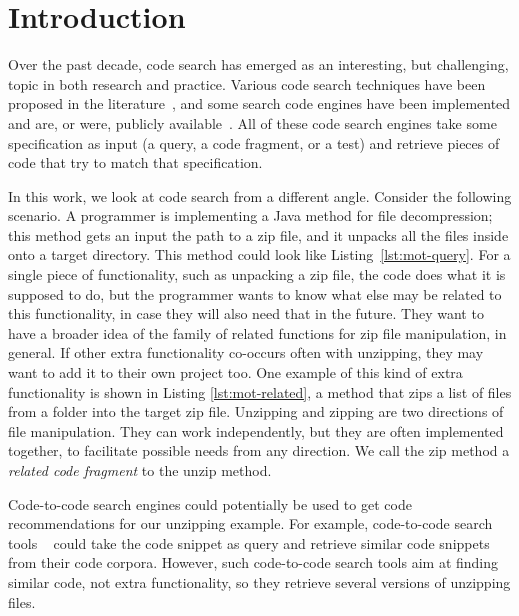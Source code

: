 \section{Introduction}
\label{sec:intro}

Over the past decade, code search has emerged as an interesting, but
challenging, topic in both research and practice. Various code search
techniques have been proposed in the
literature~\cite{bajracharya2009sourcerer,reiss2009semantics,lazzarini2009applying,mcmillan2012exemplar}, and
some search code engines have been implemented and are, or were, publicly
available~\cite{googlesearch, github,codase,krugle,ohloh,searchcode}. All
of these code search engines take some specification as input (a
query, a code fragment, or a test) and retrieve pieces of code that try
to match that specification.


In this work, we look at code search from a different angle. Consider
the following scenario. A programmer is implementing a Java method for
file decompression; this method gets an input the path to a zip file,
and it unpacks all the files inside onto a target directory. This
method could look like Listing~\ref{lst:mot-query}. For a single piece
of functionality, such as unpacking a zip file, the code does what it
is supposed to do, but the programmer wants to know what else may be
related to this functionality, in case they will also need that in the
future. They want to have a broader idea of the family of related
functions for zip file manipulation, in general. If other extra
functionality co-occurs often with unzipping, they may want to add it
to their own project too. One example of this kind of extra
functionality is shown in Listing \ref{lst:mot-related}, a method that
zips a list of files from a folder into the target zip file. Unzipping
and zipping are two directions of file manipulation. They can work
independently, but they are often implemented together, to facilitate
possible needs from any direction. We call the zip method a
\textit{related code fragment} to the unzip method.



Code-to-code search engines could potentially be used to get code
recommendations for our unzipping example. For example, code-to-code search tools
~\cite{kim2018Facoy, krugle, searchcode} could take the code snippet
as query and retrieve similar code snippets from their code
corpora. However, such code-to-code search tools aim at finding
similar code, not extra functionality, so they retrieve several
versions of unzipping files. 

